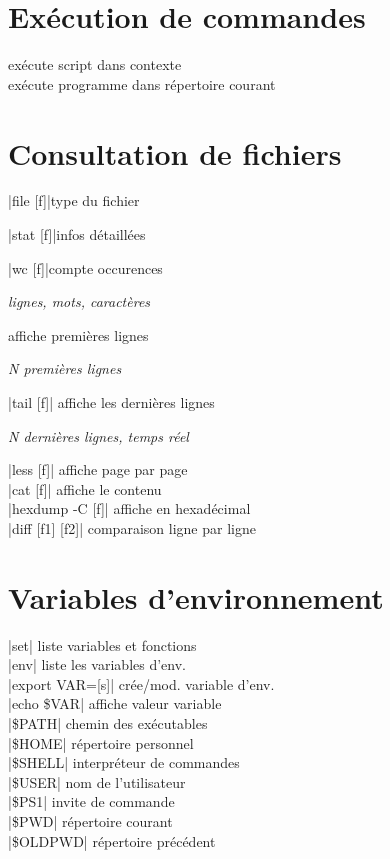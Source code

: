 \documentclass[9pt]{extarticle}
\newcommand{\lstcode}[1]{\inlinecode{\detokenize{#1}}}
\newenvironment{cmdblock}{%
  \par\setlength{\parindent}{0pt}\setlength{\parskip}{0pt}%
  \RaggedRight%
}{\par}
\newlength{\cmdoptindent}
\newcommand{\cmdopt}[1]{%
  \hspace*{\cmdoptindent}%
  \begin{minipage}[t]{\dimexpr\linewidth-\cmdoptindent\relax}
    \RaggedRight \itshape #1%
  \end{minipage}\par
}
\begin{document}
\begin{multicols}{4}
\section*{Exécution de commandes}
 \quad exécute script dans contexte \\
 exécute programme dans répertoire courant \\

\section*{Consultation de fichiers}

\begin{cmdblock}
\code|file [f]|\quad type du fichier\par
\code|stat [f]|\quad infos détaillées\par
\code|wc [f]|\quad compte occurences\par
\cmdopt{\lstcode{-l} lignes, \lstcode{-w} mots, \lstcode{-c} caractères}
\quad affiche premières lignes\par
\cmdopt{\lstcode{-n N} N premières lignes}
\code|tail [f]| \quad affiche les dernières lignes \\
\cmdopt{\lstcode{-n N} N dernières lignes,
        \lstcode{-f} temps réel}
\code|less [f]| \quad affiche page par page \\
\code|cat [f]| \quad affiche le contenu \\
\code|hexdump -C [f]| \quad affiche en hexadécimal \\
\code|diff [f1] [f2]| \quad comparaison ligne par ligne \\
\end{cmdblock}

\section*{Variables d'environnement}
\begin{cmdblock}
\code|set| \quad liste variables et fonctions \\
\code|env| \quad liste les variables d'env. \\
\code|export VAR=[s]| \quad crée/mod. variable d'env. \\
\code|echo \$VAR| \quad affiche valeur variable \\
\code|\$PATH| \quad chemin des exécutables \\
\code|\$HOME| \quad répertoire personnel \\
\code|\$SHELL| \quad interpréteur de commandes \\
\code|\$USER| \quad nom de l'utilisateur \\
\code|\$PS1| \quad invite de commande \\
\code|\$PWD| \quad répertoire courant \\
\code|\$OLDPWD| \quad répertoire précédent \\
\end{cmdblock}


\end{multicols}
\end{document}
